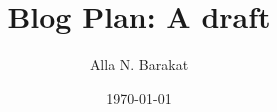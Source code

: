 \documentclass[a4paper]{scrartcl}
\begin{document}
\title{Blog Plan: A draft}
\date{\today}
\author{Alla N. Barakat}
\maketitle




\end{document}
